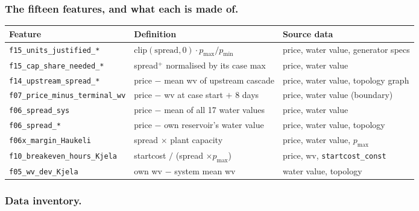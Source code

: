 \subsubsection*{The fifteen features, and what each is made of.}

\begin{center}
\footnotesize
\begin{tabular}{lll}
\toprule
Feature & Definition & Source data \\
\midrule
\texttt{f15\_units\_justified\_*} & $\mathrm{clip}(\text{spread},0)\cdot p_{\max}/p_{\min}$ & price, water value, generator specs \\
\texttt{f15\_cap\_share\_needed\_*} & spread$^+$ normalised by its case max & price, water value \\
\texttt{f14\_upstream\_spread\_*} & price $-$ mean wv of upstream cascade & price, water value, topology graph \\
\texttt{f07\_price\_minus\_terminal\_wv} & price $-$ wv at case start $+$ 8 days & price, water value (boundary) \\
\texttt{f06\_spread\_sys} & price $-$ mean of all 17 water values & price, water value \\
\texttt{f06\_spread\_*} & price $-$ own reservoir's water value & price, water value, topology \\
\texttt{f06x\_margin\_Haukeli} & spread $\times$ plant capacity & price, water value, $p_{\max}$ \\
\texttt{f10\_breakeven\_hours\_Kjela} & startcost $/$ (spread $\times p_{\max}$) & price, wv, \texttt{startcost\_const} \\
\texttt{f05\_wv\_dev\_Kjela} & own wv $-$ system mean wv & water value, topology \\
\bottomrule
\end{tabular}
\end{center}


\subsubsection*{Data inventory.}

